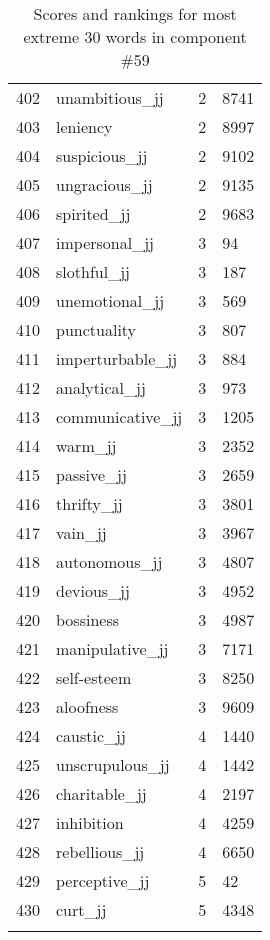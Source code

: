 \begin{longtable}[!htbp]{| rlr@{.}l |}
    402 & unambitious\_jj & 2 & 8741 \\
    403 & leniency & 2 & 8997 \\
    404 & suspicious\_jj & 2 & 9102 \\
    405 & ungracious\_jj & 2 & 9135 \\
    406 & spirited\_jj & 2 & 9683 \\
    407 & impersonal\_jj & 3 & 94 \\
    408 & slothful\_jj & 3 & 187 \\
    409 & unemotional\_jj & 3 & 569 \\
    410 & punctuality & 3 & 807 \\
    411 & imperturbable\_jj & 3 & 884 \\
    412 & analytical\_jj & 3 & 973 \\
    413 & communicative\_jj & 3 & 1205 \\
    414 & warm\_jj & 3 & 2352 \\
    415 & passive\_jj & 3 & 2659 \\
    416 & thrifty\_jj & 3 & 3801 \\
    417 & vain\_jj & 3 & 3967 \\
    418 & autonomous\_jj & 3 & 4807 \\
    419 & devious\_jj & 3 & 4952 \\
    420 & bossiness & 3 & 4987 \\
    421 & manipulative\_jj & 3 & 7171 \\
    422 & self-esteem & 3 & 8250 \\
    423 & aloofness & 3 & 9609 \\
    424 & caustic\_jj & 4 & 1440 \\
    425 & unscrupulous\_jj & 4 & 1442 \\
    426 & charitable\_jj & 4 & 2197 \\
    427 & inhibition & 4 & 4259 \\
    428 & rebellious\_jj & 4 & 6650 \\
    429 & perceptive\_jj & 5 & 42 \\
    430 & curt\_jj & 5 & 4348 \\
    \hline
    \caption{Scores and rankings for most extreme 30 words in component \#59} \\
\end{longtable}

